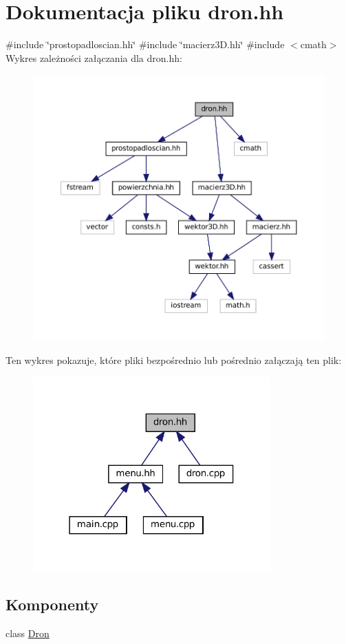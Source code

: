 \hypertarget{dron_8hh}{}\section{Dokumentacja pliku dron.\+hh}
\label{dron_8hh}
{\ttfamily \#include \char`\"{}prostopadloscian.\+hh\char`\"{}}\newline
{\ttfamily \#include \char`\"{}macierz3\+D.\+hh\char`\"{}}\newline
{\ttfamily \#include $<$cmath$>$}\newline
Wykres zależności załączania dla dron.\+hh\+:\nopagebreak
\begin{figure}[H]
\begin{center}
\leavevmode
\includegraphics[width=350pt]{dron_8hh__incl}
\end{center}
\end{figure}
Ten wykres pokazuje, które pliki bezpośrednio lub pośrednio załączają ten plik\+:\nopagebreak
\begin{figure}[H]
\begin{center}
\leavevmode
\includegraphics[width=259pt]{dron_8hh__dep__incl}
\end{center}
\end{figure}
\subsection*{Komponenty}
\begin{DoxyCompactItemize}
\item 
class \mbox{\hyperlink{class_dron}{Dron}}
\end{DoxyCompactItemize}
